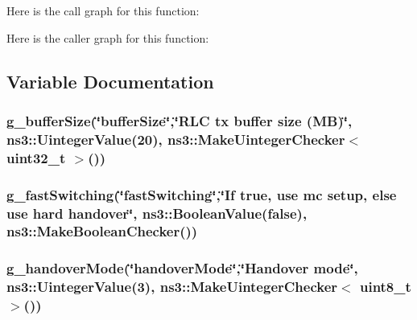 Here is the call graph for this function\+:




Here is the caller graph for this function\+:




\subsection{Variable Documentation}
\subsubsection[{\texorpdfstring{g\+\_\+buffer\+Size}{g_bufferSize}}]{ g\+\_\+buffer\+Size(\char`\"{}buffer\+Size\char`\"{},\char`\"{}R\+LC tx buffer size (MB)\char`\"{}, ns3\+::\+Uinteger\+Value(20), {\bf ns3\+::\+Make\+Uinteger\+Checker}$<$ uint32\+\_\+t $>$())\hspace{0.3cm}{\ttfamily [static]}}\hypertarget{mc-twoenbs_8cc_a0dd834a9f12c707454eb896255890f14}{}\label{mc-twoenbs_8cc_a0dd834a9f12c707454eb896255890f14}
\subsubsection[{\texorpdfstring{g\+\_\+fast\+Switching}{g_fastSwitching}}]{ g\+\_\+fast\+Switching(\char`\"{}fast\+Switching\char`\"{},\char`\"{}If true, use mc setup, else use hard handover\char`\"{}, ns3\+::\+Boolean\+Value({\bf false}), ns3\+::\+Make\+Boolean\+Checker())\hspace{0.3cm}{\ttfamily [static]}}\hypertarget{mc-twoenbs_8cc_a22575b3b732d4e3b97a32f9cbc9a78c3}{}\label{mc-twoenbs_8cc_a22575b3b732d4e3b97a32f9cbc9a78c3}
\subsubsection[{\texorpdfstring{g\+\_\+handover\+Mode}{g_handoverMode}}]{ g\+\_\+handover\+Mode(\char`\"{}handover\+Mode\char`\"{},\char`\"{}Handover mode\char`\"{}, ns3\+::\+Uinteger\+Value(3), {\bf ns3\+::\+Make\+Uinteger\+Checker}$<$ uint8\+\_\+t $>$())\hspace{0.3cm}{\ttfamily [static]}}\hypertarget{mc-twoenbs_8cc_a258c8c609c08be48673aa1aff97858e0}{}\label{mc-twoenbs_8cc_a258c8c609c08be48673aa1aff97858e0}
